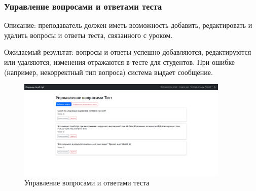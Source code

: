 \subsubsection{Управление вопросами и ответами теста}
	
Описание: преподаватель должен иметь возможность добавить, редактировать и удалить вопросы и ответы теста, связанного с уроком.
	
Ожидаемый результат: вопросы и ответы успешно добавляются, редактируются или удаляются, изменения отражаются в тесте для студентов. При ошибке (например, некорректный тип вопроса) система выдает сообщение.
	
	\begin{figure}[ht]
		\centering
		\includegraphics[width=0.9\textwidth]{images/вопросы} 
		\caption{Управление вопросами и ответами теста}
		\label{questions:image}
	\end{figure}

